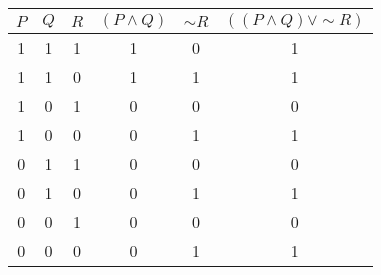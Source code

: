 \begin{tabular}{|c|c|c||c|c|c|}
\hline
$ P $ & $ Q $ & $ R $ & $ (P \wedge Q) $ & $  \sim R $ & $ ((P \wedge Q) \vee  \sim R) $ \\
\hline
1 & 1 & 1 & 1 & 0 & 1 \\
1 & 1 & 0 & 1 & 1 & 1 \\
1 & 0 & 1 & 0 & 0 & 0 \\
1 & 0 & 0 & 0 & 1 & 1 \\
0 & 1 & 1 & 0 & 0 & 0 \\
0 & 1 & 0 & 0 & 1 & 1 \\
0 & 0 & 1 & 0 & 0 & 0 \\
0 & 0 & 0 & 0 & 1 & 1 \\
\hline
\end{tabular}
